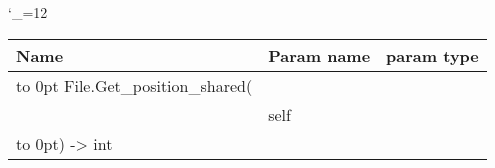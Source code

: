 \begingroup \catcode`\_=12 \tt
\begin{tabular}{lll}
\toprule
\textrm{Name}&\textrm{Param name}&\textrm{param type}\\
\midrule
\hbox to 0pt {File.Get_position_shared(\hss}\\
& self\\
\hbox to 0pt{) -> int\hss}\\
\bottomrule
\end{tabular}
\endgroup
